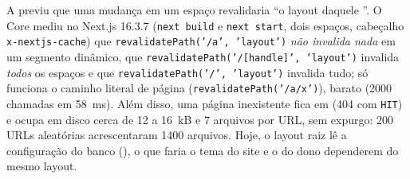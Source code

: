 {A  previu que uma mudança em um espaço revalidaria ``o layout daquele ''. O Core mediu no Next.js 16.3.7 (\texttt{next build} e \texttt{next start}, dois espaços, cabeçalho \texttt{x-nextjs-cache}) que \texttt{revalidatePath('/a', 'layout')} \emph{não invalida nada} em um segmento dinâmico, que \texttt{revalidatePath('/[handle]', 'layout')} invalida \emph{todos} os espaços e que \texttt{revalidatePath('/', 'layout')} invalida tudo; só funciona o caminho literal de página (\texttt{revalidatePath('/a/x')}), barato (2000 chamadas em 58~ms). Além disso, uma página inexistente fica em  (404 com \texttt{HIT}) e ocupa em disco cerca de 12 a 16~kB e 7 arquivos por URL, sem expurgo: 200 URLs aleatórias acrescentaram 1400 arquivos. Hoje, o layout raiz lê a configuração do banco (), o que faria o tema do site e o do dono dependerem do mesmo layout.}
